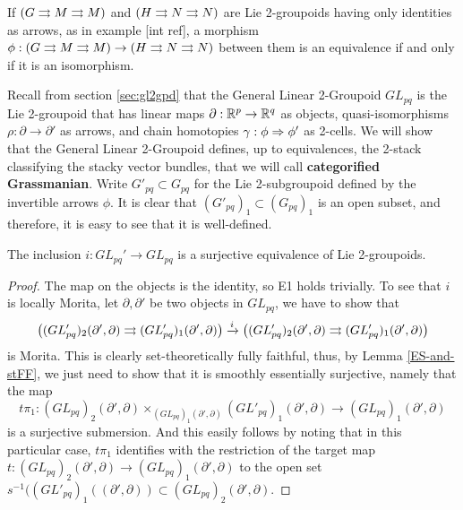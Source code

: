 \begin{example}
If $(G\rightrightarrows M\rightrightarrows M)$ and $(H\rightrightarrows N\rightrightarrows N)$ are Lie 2-groupoids having only identities as arrows, as in example [int ref], a morphism $\phi : (G\rightrightarrows M\rightrightarrows M)\to (H\rightrightarrows N\rightrightarrows N)$ between them is an equivalence if and only if it is an isomorphism.
\end{example}


Recall from section \ref{sec:gl2gpd} that the General Linear 2-Groupoid $GL_{pq}$ is the Lie 2-groupoid that has linear maps $\partial:\mathbb R^p\to\mathbb R^q$ as objects, quasi-isomorphisms $\rho:\partial\to\partial'$ as arrows, and chain homotopies $\gamma:\phi\Rightarrow\phi'$ as 2-cells.
We will show that the General Linear 2-Groupoid defines, up to equivalences, the 2-stack classifying the stacky vector bundles, that we will call {\bf categorified Grassmanian}.
Write $G'_{pq}\subset G_{pq}$ for the Lie 2-subgroupoid defined by the invertible arrows $\phi$. It is clear that $(G'_{pq})_1\subset (G_{pq})_1$ is an open subset, and therefore, it is easy to see that it is well-defined.

\begin{lemma}
The inclusion $i:GL_{pq}' \to GL_{pq}$ is a surjective equivalence of Lie 2-groupoids.
\end{lemma}

\begin{proof}
The map on the objects is the identity, so E1 holds trivially.
To see that $i$ is locally Morita, let $\partial,\partial'$ be two objects in $GL_{pq}$, we have to show that
$$ \big( (GL'_{pq})_2(\partial',\partial)\rightrightarrows (GL'_{pq})_1(\partial',\partial) \big) \xrightarrow{i} \big( (GL'_{pq})_2(\partial',\partial)\rightrightarrows (GL'_{pq})_1(\partial',\partial) \big)$$
is Morita.
This is clearly set-theoretically fully faithful, thus, by Lemma \ref{ES-and-stFF}, we just need to show that it is smoothly essentially surjective, namely that the map
$$ t\pi_1: (GL_{pq})_2(\partial', \partial) \times_{(GL_{pq})_1(\partial', \partial)} (GL'_{pq})_1(\partial', \partial) \to (GL_{pq})_1(\partial', \partial) $$
is a surjective submersion.
And this easily follows by noting that in this particular case, $t\pi_1$ identifies with the restriction of the target map
$t: (GL_{pq})_2(\partial', \partial) \to (GL_{pq})_1(\partial', \partial)$
to the open set
$s^{-1}((GL'_{pq})_1((\partial', \partial)) \subset (GL_{pq})_2(\partial', \partial)$.
\end{proof}

